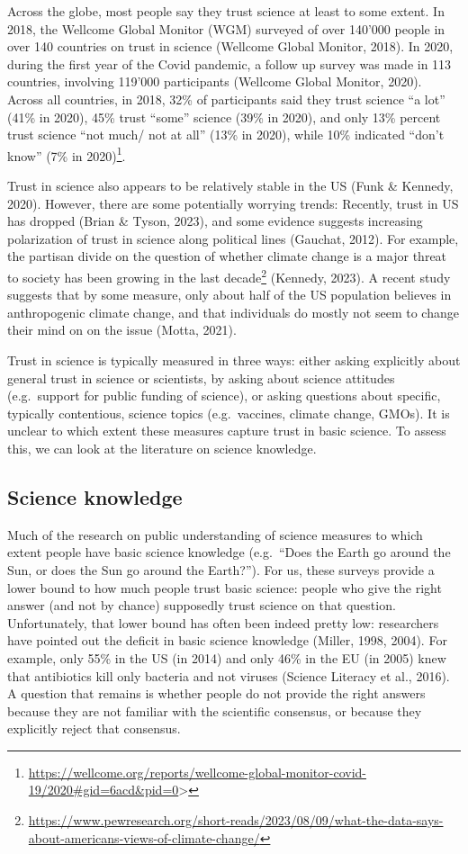 \documentclass[
  doc,floatsintext]{apa6}
\begin{document}
Across the globe, most people say they trust science at least to some extent. In 2018, the Wellcome Global Monitor (WGM) surveyed of over 140'000 people in over 140 countries on trust in science (Wellcome Global Monitor, 2018). In 2020, during the first year of the Covid pandemic, a follow up survey was made in 113 countries, involving 119'000 participants (Wellcome Global Monitor, 2020). Across all countries, in 2018, 32\% of participants said they trust science ``a lot'' (41\% in 2020), 45\% trust ``some'' science (39\% in 2020), and only 13\% percent trust science ``not much/ not at all'' (13\% in 2020), while 10\% indicated ``don't know'' (7\% in 2020)\footnote{\url{https://wellcome.org/reports/wellcome-global-monitor-covid-19/2020\#gid=6acd&pid=0}\textgreater{}}.

Trust in science also appears to be relatively stable in the US (Funk \& Kennedy, 2020). However, there are some potentially worrying trends: Recently, trust in US has dropped (Brian \& Tyson, 2023), and some evidence suggests increasing polarization of trust in science along political lines (Gauchat, 2012). For example, the partisan divide on the question of whether climate change is a major threat to society has been growing in the last decade\footnote{\url{https://www.pewresearch.org/short-reads/2023/08/09/what-the-data-says-about-americans-views-of-climate-change/}} (Kennedy, 2023). A recent study suggests that by some measure, only about half of the US population believes in anthropogenic climate change, and that individuals do mostly not seem to change their mind on on the issue (Motta, 2021).

Trust in science is typically measured in three ways: either asking explicitly about general trust in science or scientists, by asking about science attitudes (e.g.~support for public funding of science), or asking questions about specific, typically contentious, science topics (e.g.~vaccines, climate change, GMOs). It is unclear to which extent these measures capture trust in basic science. To assess this, we can look at the literature on science knowledge.

\subsection{Science knowledge}\label{science-knowledge}

Much of the research on public understanding of science measures to which extent people have basic science knowledge (e.g.~``Does the Earth go around the Sun, or does the Sun go around the Earth?''). For us, these surveys provide a lower bound to how much people trust basic science: people who give the right answer (and not by chance) supposedly trust science on that question. Unfortunately, that lower bound has often been indeed pretty low: researchers have pointed out the deficit in basic science knowledge (Miller, 1998, 2004). For example, only 55\% in the US (in 2014) and only 46\% in the EU (in 2005) knew that antibiotics kill only bacteria and not viruses (Science Literacy et al., 2016). A question that remains is whether people do not provide the right answers because they are not familiar with the scientific consensus, or because they explicitly reject that consensus.
\end{document}
